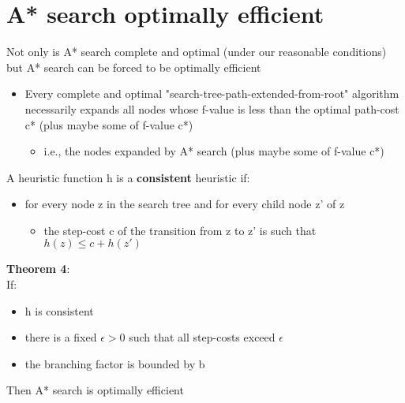 \documentclass{article}[18pt]
\begin{document}
\section{A* search optimally efficient}
Not only is A* search complete and optimal (under our reasonable conditions) but A* search can be forced to be optimally efficient
\begin{itemize}
	\item Every complete and optimal "search-tree-path-extended-from-root" algorithm necessarily expands all nodes whose f-value is less than the optimal path-cost c* (plus maybe some of f-value c*)
	\begin{itemize}
		\item i.e., the nodes expanded by A* search (plus maybe some of f-value c*)
	\end{itemize}
\end{itemize}
A heuristic function h is a \textbf{consistent} heuristic if:
\begin{itemize}
	\item for every node z in the search tree and for every child node z' of z
	\begin{itemize}
		\item the step-cost c of the transition from z to z' is such that $h(z)\leqslant c+h(z')$
	\end{itemize}
\end{itemize}
\textbf{Theorem 4}:\\
If:
\begin{itemize}
	\item h is consistent
	\item there is a fixed $\epsilon >0$ such that all step-costs exceed $\epsilon$
	\item the branching factor is bounded by b
\end{itemize}
Then A* search is optimally efficient
\end{document}
